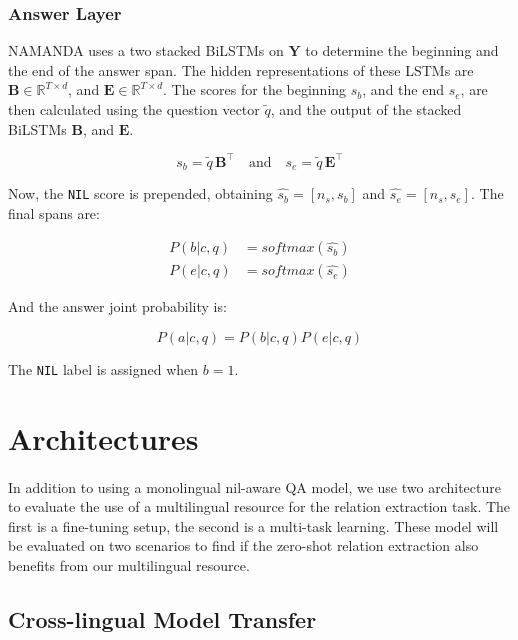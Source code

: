 \subsubsection{Answer Layer}
NAMANDA uses a two stacked BiLSTMs on $\mathbf{Y}$ to determine the beginning and the end of the answer span. The hidden representations of these LSTMs are $\mathbf{B} \in \mathbb{R}^{T \times d}$, and $\mathbf{E} \in \mathbb{R}^{T \times d}$. The scores for the beginning $s_b$, and the end $s_e$, are then calculated using the question vector $\tilde{q}$, and the output of the stacked BiLSTMs $\mathbf{B}$, and $\mathbf{E}$.

\begin{equation}
s_b = \tilde{q} \, \mathbf{B}^{\intercal}
   \quad\mathrm{and}\quad 
s_e = \tilde{q}\, \mathbf{E}^{\intercal}
\end{equation}

Now, the \texttt{NIL} score is prepended, obtaining $\hat{s_b} = [n_s, s_b]$ and $\hat{s_e} = [n_s, s_e]$. The final spans are:

\begin{equation}
\begin{split}
    P(b | c, q) & = softmax(\hat{s_b}) \\
    P(e | c, q) & = softmax(\hat{s_e})
\end{split}
\end{equation}

And the answer joint probability is:

\begin{equation}
    P(a|c, q) = P(b | c, q)P(e | c, q)
\end{equation}

The \texttt{NIL} label is assigned when $b=1$.

\section{Architectures}
\paragraph{}
In addition to using a monolingual nil-aware QA model, we use two architecture to evaluate the use of a multilingual resource for the relation extraction task. The first is a fine-tuning setup, the second is a multi-task learning. These model will be evaluated on two scenarios to find if the zero-shot relation extraction also benefits from our multilingual resource. 

\subsection{Cross-lingual Model Transfer}
\label{sec:xlingual}
